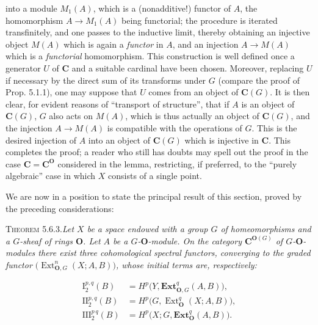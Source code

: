 \clearpage
{}

\noindent into a module $M_1(A)$, which is a (nonadditive!) functor of $A$, the
homomorphism $A\to M_1(A)$ being functorial; the procedure is
iterated transfinitely, and one passes to the inductive limit, thereby
obtaining an injective object $M(A)$ which is again a \textit{functor} in $A$, and an
injection $A\to M(A)$ which is a \textit{functorial} homomorphism. This
construction is well defined once a generator $U$ of ${\mathbf C}$ and a suitable
cardinal have been chosen. Moreover, replacing $U$ if necessary by the direct
sum of its transforms under $G$ (compare the proof of Prop. 5.1.1), one may
suppose that $U$ comes from an object of ${\mathbf C}(G)$. It is then clear, for evident
reasons of ``transport of structure'', that if $A$ is an object of ${\mathbf C}(G)$,
$G$ also acts on $M(A)$, which is thus actually an object of ${\mathbf C}(G)$, and the
injection $A\to M(A)$ is compatible with the operations of $G$.
This is the desired injection of $A$ into an object of ${\mathbf C}(G)$ which is
injective in ${\mathbf C}$.
This completes the proof; a reader who still has doubts may spell out the
proof in the case ${\mathbf C}={\mathbf C}^{\mathbf O}$ considered in the lemma, restricting, if preferred,
to the ``purely algebraic'' case in which $X$ consists of a single point.

We are now in a position to state the principal result of this section, proved
by the preceding considerations:

\textsc{Theorem 5.6.3.}\quad \textit{Let $X$ be a space endowed with
a group $G$ of homeomorphisms and a $G$-sheaf of rings ${\mathbf O}$. Let $A$ be a
$G$-${\mathbf O}$-module. On the category ${\mathbf C}^{{\mathbf O}(G)}$ of $G$-${\mathbf O}$-modules there exist
three cohomological spectral functors, converging to the graded functor
$\bigl(\operatorname{Ext}_{{\mathbf O},G}^n(X;A,B)\bigr)$, whose initial terms are,
respectively:}

\begin{equation}
\begin{aligned}
\mathrm I_2^{p,q}(B)
  &=H^p\bigl(Y,\mathbf{Ext}_{{\mathbf O},G}^q(A,B)\bigr),\\
\mathrm {II}_2^{p,q}(B)
  &=H^p\bigl(G,\operatorname{Ext}_{\mathbf O}^q(X;A,B)\bigr),\\
\mathrm {III}_2^{p\,q}(B)
  &=H^p\bigl(X;G,\mathbf{Ext}_{\mathbf O}^q(A,B)\bigr).
\end{aligned}
\tag{5.6.11}
\end{equation}

